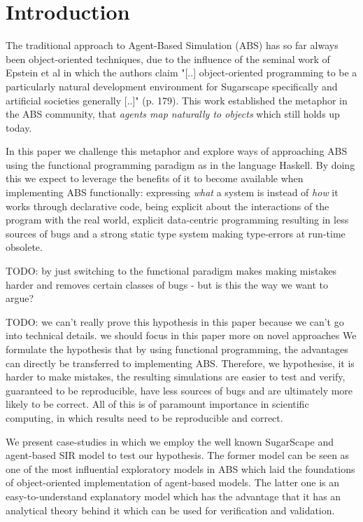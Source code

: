 \section{Introduction}
The traditional approach to Agent-Based Simulation (ABS) has so far always been object-oriented techniques, due to the influence of the seminal work of Epstein et al \cite{epstein_growing_1996} in which the authors claim "[..] object-oriented programming to be a particularly natural development environment for Sugarscape specifically and artificial societies generally [..]" (p. 179). This work established the metaphor in the ABS community, that \textit{agents map naturally to objects} \citep{north_managing_2007} which still holds up today.

In this paper we challenge this metaphor and explore ways of approaching ABS using the functional programming paradigm as in the language Haskell. By doing this we expect to leverage the benefits of it \citep{hudak_history_2007} to become available when implementing ABS functionally: expressing \textit{what} a system is instead of \textit{how} it works through declarative code, being explicit about the interactions of the program with the real world, explicit data-centric programming resulting in less sources of bugs and a strong static type system making type-errors at run-time obsolete. 

TODO: by just switching to the functional paradigm makes making mistakes harder and removes certain classes of bugs - but is this the way we want to argue? 

TODO: we can't really prove this hypothesis in this paper because we can't go into technical details. we should focus in this paper more on novel approaches 
We formulate the hypothesis that by using functional programming, the advantages can directly be transferred to implementing ABS. Therefore, we hypothesise, it is harder to make mistakes, the resulting simulations are easier to test and verify, guaranteed to be reproducible, have less sources of bugs and are ultimately more likely to be correct. All of this is of paramount importance in scientific computing, in which results need to be reproducible and correct.

We present case-studies in which we employ the well known SugarScape \citep{epstein_growing_1996} and agent-based SIR \citep{macal_agent-based_2010} model to test our hypothesis. The former model can be seen as one of the most influential exploratory models in ABS which laid the foundations of object-oriented implementation of agent-based models. The latter one is an easy-to-understand explanatory model which has the advantage that it has an analytical theory behind it which can be used for verification and validation.


